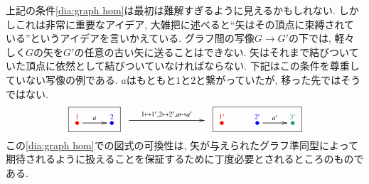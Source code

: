 \begin{remark}


上記の条件\eqref{dia:graph hom}は最初は難解すぎるように見えるかもしれない. しかしこれは非常に重要なアイデア, 大雑把に述べると``矢はその頂点に束縛されている''というアイデアを言いかえている. グラフ間の写像$G\to G'$の下では, 軽々しく$G$の矢を$G'$の任意の古い矢に送ることはできない. 矢はそれまで結びついていた頂点に依然として結びついていなければならない. 下記はこの条件を尊重していない写像の例である. $a$はもともと$1$と$2$と繋がっていたが, 移った先ではそうではない.
$$
\fbox{\xymatrix{\LMO{\color{red}{1}}\ar[r]^{a}&\LMO{\color{blue}{2}}}}
\xymatrix{~\ar[rr]^{1\mapsto 1',2\mapsto 2', a\mapsto a'}&\hsp&~}
\fbox{\xymatrix{\LMO{\color{red}{1'}}&\LMO{\color{blue}{2'}}\ar[r]^{a'}&\LMO{\color{ForestGreen}{3'}}}}
$$
この\eqref{dia:graph hom}での図式の可換性は, 矢が与えられたグラフ準同型によって期待されるように扱えることを保証するために丁度必要とされるところのものである.
 
\end{remark}

